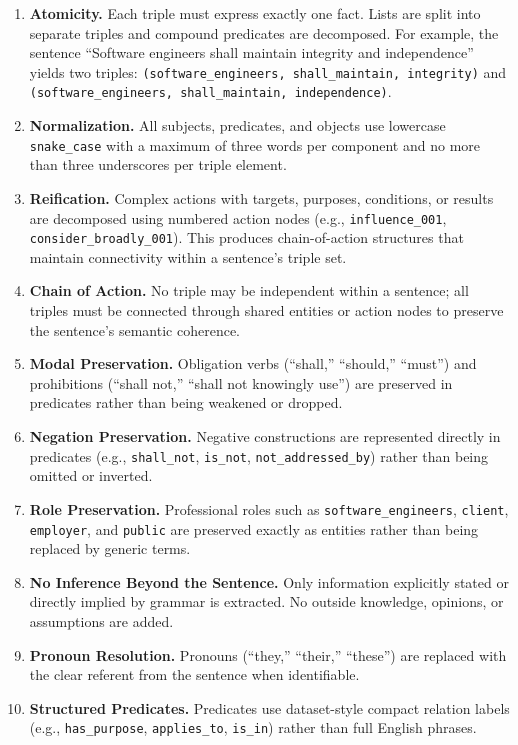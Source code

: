 \documentclass[conference]{IEEEtran}
\begin{document}
\begin{enumerate}[leftmargin=*]
\item \textbf{Atomicity.} Each triple must express exactly one fact. Lists are split into separate triples and compound predicates are decomposed. For example, the sentence ``Software engineers shall maintain integrity and independence'' yields two triples: \texttt{(software\_engineers, shall\_maintain, integrity)} and \texttt{(software\_engineers, shall\_maintain, independence)}.

\item \textbf{Normalization.} All subjects, predicates, and objects use lowercase \texttt{snake\_case} with a maximum of three words per component and no more than three underscores per triple element.

\item \textbf{Reification.} Complex actions with targets, purposes, conditions, or results are decomposed using numbered action nodes (e.g., \texttt{influence\_001}, \texttt{consider\_broadly\_001}). This produces chain-of-action structures that maintain connectivity within a sentence's triple set.

\item \textbf{Chain of Action.} No triple may be independent within a sentence; all triples must be connected through shared entities or action nodes to preserve the sentence's semantic coherence.

\item \textbf{Modal Preservation.} Obligation verbs (``shall,'' ``should,'' ``must'') and prohibitions (``shall not,'' ``shall not knowingly use'') are preserved in predicates rather than being weakened or dropped.

\item \textbf{Negation Preservation.} Negative constructions are represented directly in predicates (e.g., \texttt{shall\_not}, \texttt{is\_not}, \texttt{not\_addressed\_by}) rather than being omitted or inverted.

\item \textbf{Role Preservation.} Professional roles such as \texttt{software\_engineers}, \texttt{client}, \texttt{employer}, and \texttt{public} are preserved exactly as entities rather than being replaced by generic terms.

\item \textbf{No Inference Beyond the Sentence.} Only information explicitly stated or directly implied by grammar is extracted. No outside knowledge, opinions, or assumptions are added.

\item \textbf{Pronoun Resolution.} Pronouns (``they,'' ``their,'' ``these'') are replaced with the clear referent from the sentence when identifiable.

\item \textbf{Structured Predicates.} Predicates use dataset-style compact relation labels (e.g., \texttt{has\_purpose}, \texttt{applies\_to}, \texttt{is\_in}) rather than full English phrases.
\end{enumerate}
\end{document}
